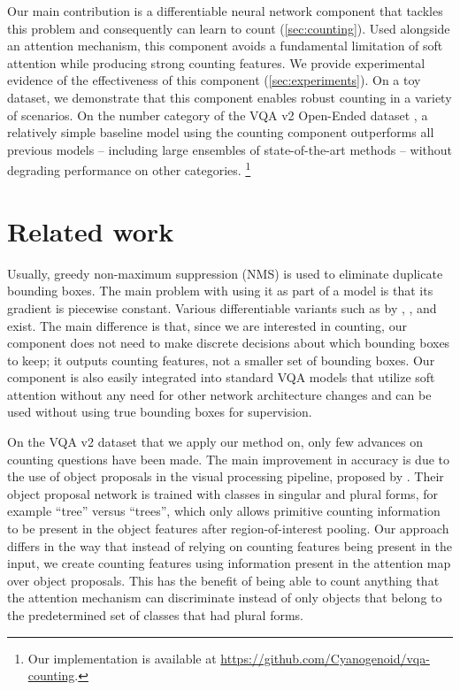 \documentclass[letterpaper]{article}
\begin{document}
Our main contribution is a differentiable neural network component that tackles this problem and consequently can learn to count (\autoref{sec:counting}).
Used alongside an attention mechanism, this component avoids a fundamental limitation of soft attention while producing strong counting features.
We provide experimental evidence of the effectiveness of this component (\autoref{sec:experiments}).
On a toy dataset, we demonstrate that this component enables robust counting in a variety of scenarios.
On the number category of the VQA v2 Open-Ended dataset \citep{Goyal2017a}, a relatively simple baseline model using the counting component outperforms all previous models -- including large ensembles of state-of-the-art methods -- without degrading performance on other categories.
\footnote{Our implementation is available at \url{https://github.com/Cyanogenoid/vqa-counting}.}


\section{Related work}\label{sec:related}
Usually, greedy non-maximum suppression (NMS) is used to eliminate duplicate bounding boxes.
The main problem with using it as part of a model is that its gradient is piecewise constant.
Various differentiable variants such as by \citet{Azadi2017a}, \citet{Hosang2017a}, and \citet{Henderson2017a} exist.
The main difference is that, since we are interested in counting, our component does not need to make discrete decisions about which bounding boxes to keep; it outputs counting features, not a smaller set of bounding boxes.
Our component is also easily integrated into standard VQA models that utilize soft attention without any need for other network architecture changes and can be used without using true bounding boxes for supervision.

On the VQA v2 dataset \citep{Goyal2017a} that we apply our method on, only few advances on counting questions have been made.
The main improvement in accuracy is due to the use of object proposals in the visual processing pipeline, proposed by \citet{Anderson2017a}.
Their object proposal network is trained with classes in singular and plural forms, for example ``tree'' versus ``trees'', which only allows primitive counting information to be present in the object features after region-of-interest pooling.
Our approach differs in the way that instead of relying on counting features being present in the input, we create counting features using information present in the attention map over object proposals.
This has the benefit of being able to count anything that the attention mechanism can discriminate instead of only objects that belong to the predetermined set of classes that had plural forms.
\end{document}
